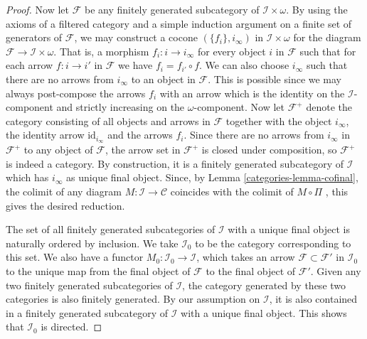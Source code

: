 \begin{proof}
\medskip\noindent
Now let $\mathcal{F}$ be any finitely generated
subcategory of $\mathcal{I}\times \omega$.
By using the axioms of a filtered category and a simple induction
argument on a finite set of generators of $\mathcal{F}$,
we may construct a cocone $(\{f_i\}, i_\infty)$ in $\mathcal{I} \times \omega$
for the diagram $\mathcal{F} \to \mathcal{I} \times \omega$. That is, a morphism
$f_i : i \to i_\infty$ for every object $i$ in $\mathcal{F}$
such that for each arrow $f : i \to i'$ in $\mathcal{F}$
we have $f_i = f_{i'} \circ f$. We can also choose $i_\infty$ such
that there are no arrows from $i_\infty$ to an object in $\mathcal{F}$.
This is possible since
we may always post-compose the arrows $f_i$ with an arrow
which is the identity on the $\mathcal{I}$-component and
strictly increasing on the $\omega$-component.
Now let $\mathcal{F}^+$ denote the category consisting of all
objects and arrows in $\mathcal{F}$
together with the object $i_\infty$, the identity
arrow $\text{id}_{i_\infty}$ and the arrows $f_i$.
Since there are no arrows from $i_\infty$ in $\mathcal{F}^+$
to any object of $\mathcal{F}$, the arrow set in $\mathcal{F}^+$
is closed under composition, so $\mathcal{F}^+$ is indeed
a category. By construction, it is a finitely
generated subcategory of $\mathcal{I}$ which has $i_\infty$ as
unique final object. Since, by Lemma \ref{categories-lemma-cofinal},
the colimit of any diagram $M : \mathcal{I} \to \mathcal{C}$
coincides with the colimit of $M\circ\Pi$ , this gives the desired
reduction.

\medskip\noindent
The set of all finitely generated subcategories of $\mathcal{I}$
with a unique final object is naturally ordered by inclusion.
We take $\mathcal{I}_0$ to be the category corresponding
to this set. We also have a functor
$M_0 : \mathcal{I}_0 \to \mathcal{I}$, which takes an
arrow $\mathcal{F} \subset \mathcal{F'}$ in
$\mathcal{I}_0$ to the unique map from the final object of
$\mathcal{F}$ to the final object of $\mathcal{F}'$.
Given any two finitely generated subcategories of
$\mathcal{I}$, the category generated by these two categories is
also finitely generated. By our assumption on $\mathcal{I}$, it is
also contained in a finitely generated subcategory of $\mathcal{I}$
with a unique final object. This shows that $\mathcal{I}_0$ is directed.


\end{proof}
